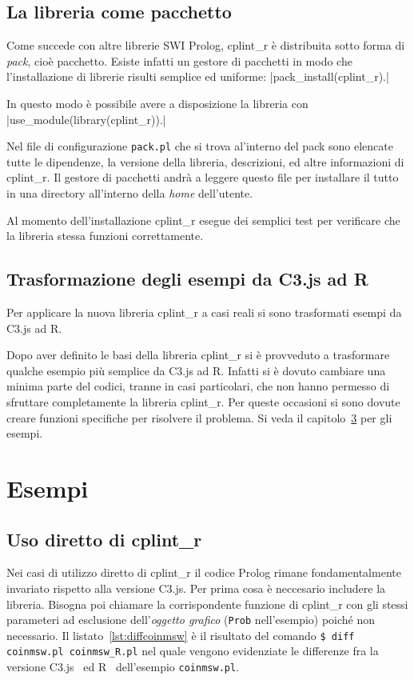 \documentclass[10pt,titlepage,twoside,a4paper]{report}
\begin{document}

\section{La libreria come pacchetto}
Come succede con altre librerie SWI Prolog, cplint\_r è distribuita sotto 
forma di \emph{pack}, cioè pacchetto. Esiste infatti un gestore di pacchetti 
in modo che l'installazione di librerie risulti semplice ed uniforme: 
|pack_install(cplint_r).|

In questo modo è possibile avere a disposizione la libreria con 
|use_module(library(cplint_r)).|

Nel file di configurazione \texttt{pack.pl} che si trova al'interno del pack 
sono elencate tutte le dipendenze, la versione della libreria, descrizioni, 
ed altre informazioni di cplint\_r. Il gestore di pacchetti andrà a leggere 
questo file per installare il tutto in una directory all'interno della 
\emph{home} dell'utente.

Al momento dell'installazione cplint\_r esegue dei semplici 
test per verificare che la libreria stessa funzioni correttamente.


\section{Trasformazione degli esempi da C3.js ad R}
\label{sec:trasformazione-degli-esempi-da-c3js-ad-r}
Per applicare la nuova libreria cplint\_r a casi reali si sono trasformati 
esempi da C3.js ad R.

Dopo aver definito le basi della libreria cplint\_r si è provveduto a 
trasformare qualche esempio più semplice da C3.js ad R. Infatti si è 
dovuto cambiare una minima parte del codici, tranne in casi particolari, che 
non hanno permesso di sfruttare completamente la 
libreria cplint\_r. Per queste occasioni si sono dovute creare funzioni 
specifiche per risolvere il problema. Si veda il capitolo~\ref{ch:esempi} per 
gli esempi.




\chapter{Esempi}
\label{ch:esempi}

\section{Uso diretto di cplint\_r}
Nei casi di utilizzo diretto di cplint\_r il codice Prolog rimane 
fondamentalmente invariato rispetto alla  versione C3.js. Per prima cosa è 
neccesario includere la libreria. Bisogna poi chiamare la corrispondente 
funzione di cplint\_r con gli stessi parameteri ad esclusione 
dell'\emph{oggetto grafico} (\texttt{Prob} nell'esempio) poiché non 
necessario. Il listato~\ref{lst:diffcoinmsw} è il risultato del comando
\texttt{\$ diff coinmsw.pl coinmsw\_R.pl}
nel quale vengono evidenziate le differenze fra la versione 
C3.js~\cite{coinmswpl} ed R~\cite{coinmswrpl} dell'esempio \texttt{coinmsw.pl}.
\end{document}
